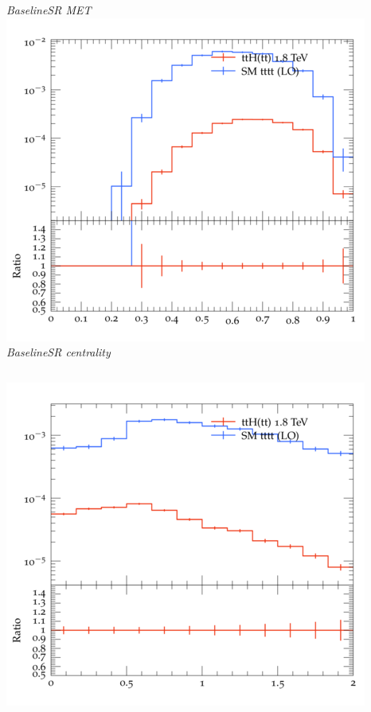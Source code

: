 \documentclass{beamer}
\begin{document}
\begin{frame}
\begin{columns}
\textit{\small BaselineSR MET}
\includegraphics[width=\textwidth]{../plots/ttH_1800/tttt_ttH_1LOS/BaselineSR_centrality.png}\\
\textit{\small BaselineSR centrality}
\end{columns}
\begin{columns}
\includegraphics[width=\textwidth]{../plots/ttH_1800/tttt_ttH_1LOS/BaselineSR_deltaR_bl_min.png}\\

\end{columns}
\end{frame}
\end{document}
